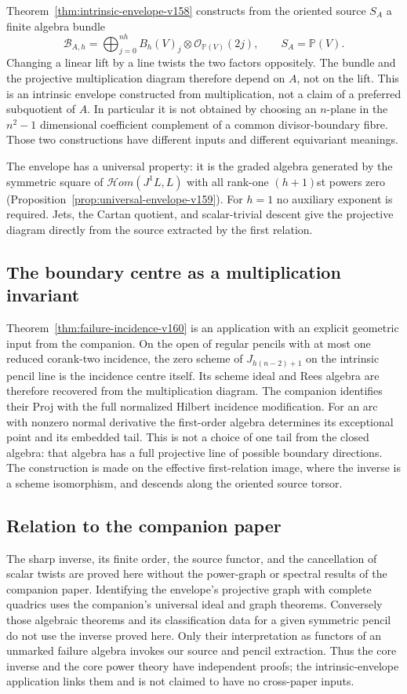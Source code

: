 \documentclass[11pt,reqno]{amsart}
\numberwithin{equation}{section}
\theoremstyle{definition}\newtheorem{definition}[theorem]{Definition}
\theoremstyle{remark}\newtheorem{remark}[theorem]{Remark}
\newcommand{\Pj}{\mathbb P}\newcommand{\A}{\mathbb A}
\newcommand{\OO}{\mathcal O}\newcommand{\II}{\mathcal I}
\begin{document}
Theorem~\ref{thm:intrinsic-envelope-v158} constructs from the oriented
source $S_A$ a finite algebra bundle
\[
 \mathscr B_{A,h}=\bigoplus_{j=0}^{nh}
                    B_h(V)_j\otimes\OO_{\Pj(V)}(2j),
 \qquad S_A=\Pj(V).
\]
Changing a linear lift by a line twists the two factors oppositely.
The bundle and the projective multiplication diagram therefore depend
on $A$, not on the lift. This is an intrinsic envelope constructed
from multiplication, not a claim of a preferred subquotient of $A$.
In particular it is not obtained by choosing an $n$-plane in the
$n^2-1$ dimensional coefficient complement of a common divisor-boundary
fibre. Those two constructions have different inputs and different
equivariant meanings.

The envelope has a universal property: it is the graded algebra generated
by the symmetric square of $\mathcal Hom(J^1L,L)$ with all rank-one
$(h+1)$st powers zero (Proposition~\ref{prop:universal-envelope-v159}).
For $h=1$ no auxiliary exponent is required. Jets, the Cartan quotient,
and scalar-trivial descent give the projective diagram directly from
the source extracted by the first relation.

\subsection{The boundary centre as a multiplication invariant}
Theorem~\ref{thm:failure-incidence-v160} is an application with an
explicit geometric input from the companion. On the open of regular
pencils with at most one reduced corank-two incidence, the zero scheme
of $J_{h(n-2)+1}$ on the intrinsic pencil line is the incidence centre
itself. Its scheme ideal and Rees algebra are therefore recovered
from the multiplication diagram. The companion identifies their
Proj with the full normalized Hilbert incidence modification. For an
arc with nonzero normal derivative the first-order algebra determines
its exceptional point and its embedded tail. This is not a choice of
one tail from the closed algebra: that algebra has a full projective
line of possible boundary directions. The construction is made on
the effective first-relation image, where the inverse is a scheme
isomorphism, and descends along the oriented source torsor.

\subsection{Relation to the companion paper}
The sharp inverse, its finite order, the source functor, and the
cancellation of scalar twists are proved here without the power-graph
or spectral results of the companion paper. Identifying the envelope's
projective graph with complete quadrics uses the companion's universal
ideal and graph theorems. Conversely those algebraic theorems and its
classification data for a given symmetric pencil do not use the inverse
proved here. Only their interpretation as functors of an unmarked
failure algebra invokes our source and pencil extraction. Thus the
core inverse and the core power theory have independent proofs; the
intrinsic-envelope application links them and is not claimed to have
no cross-paper inputs.
\end{document}
